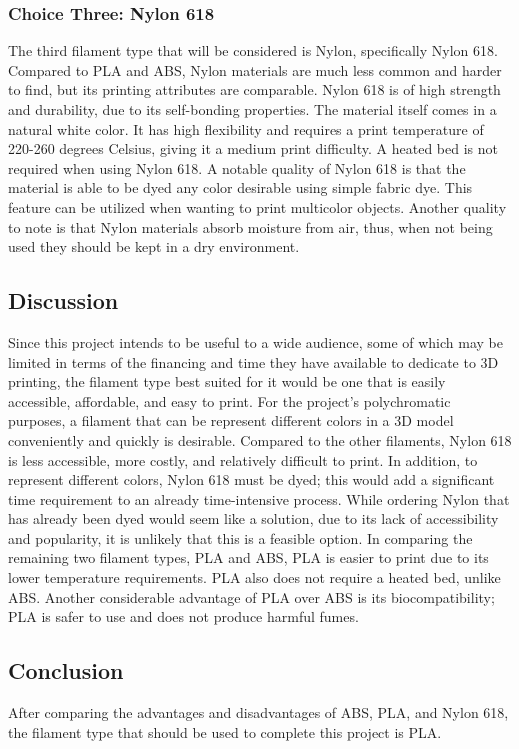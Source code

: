 \documentclass[letterpaper, onecolumn, draftclsnofoot,10pt, compsoc]{IEEEtran}
\begin{document}
\subsubsection{Choice Three: Nylon 618}
The third filament type that will be considered is Nylon, specifically Nylon 618. 
Compared to PLA and ABS, Nylon materials are much less common and harder to find, but its printing attributes are comparable.
Nylon 618 is of high strength and durability, due to its self-bonding properties. 
The material itself comes in a natural white color. 
It has high flexibility and requires a print temperature of 220-260 degrees Celsius, giving it a medium print difficulty. 
A heated bed is not required when using Nylon 618.
A notable quality of Nylon 618 is that the material is able to be dyed any color desirable using simple fabric dye. 
This feature can be utilized when wanting to print multicolor objects. 
Another quality to note is that Nylon materials absorb moisture from air, thus, when not being used they should be kept in a dry environment. \cite{filamentweb}

\subsection{Discussion}
Since this project intends to be useful to a wide audience, some of which may be limited in terms of the financing and time they have available to dedicate to 3D printing, the filament type best suited for it would be one that is easily accessible, affordable, and easy to print.
For the project's polychromatic purposes, a filament that can be represent different colors in a 3D model conveniently and quickly is desirable.
Compared to the other filaments, Nylon 618 is less accessible, more costly, and relatively difficult to print.
In addition, to represent different colors, Nylon 618 must be dyed; this would add a significant time requirement to an already time-intensive process.
While ordering Nylon that has already been dyed would seem like a solution, due to its lack of accessibility and popularity, it is unlikely that this is a feasible option.
In comparing the remaining two filament types, PLA and ABS, PLA is easier to print due to its lower temperature requirements. 
PLA also does not require a heated bed, unlike ABS. 
Another considerable advantage of PLA over ABS is its biocompatibility; PLA is safer to use and does not produce harmful fumes.
\subsection{Conclusion}
After comparing the advantages and disadvantages of ABS, PLA, and Nylon 618, the filament type that should be used to complete this project is PLA.
\end{document}
